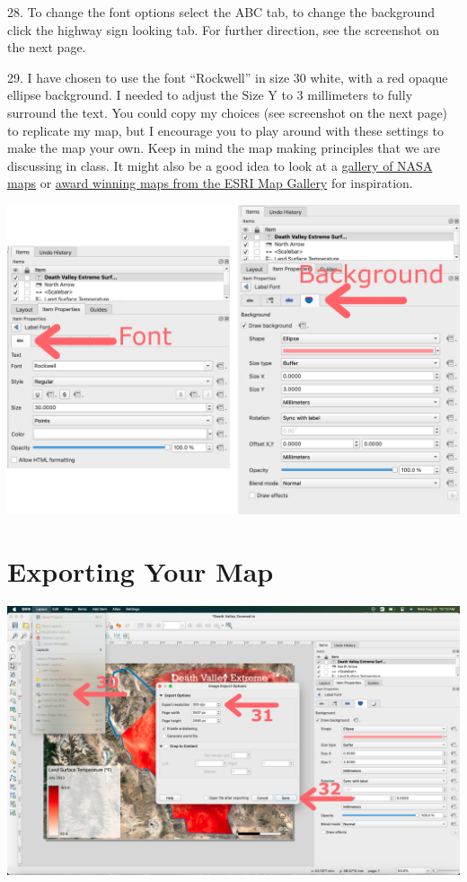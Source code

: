 \documentclass[oneside,a4paper,11pt,explicit]{book}
\begin{document}
28. To change the font options select the ABC tab, to change the background click the highway sign looking tab. For further direction, see the screenshot on the next page.

29.  I have chosen to use the font ``Rockwell'' in size 30 white, with a red opaque ellipse background. I needed to adjust the Size Y to 3 millimeters to fully surround the text. You could copy my choices (see screenshot on the next page) to replicate my map, but I encourage you to play around with these settings to make the map your own. Keep in mind the map making principles that we are discussing in class. It might also be a good idea to look at a \href{https://science.nasa.gov/earth/multimedia/}{gallery of NASA maps} or \href{https://mapgallery.esri.com/}{award winning maps from the ESRI Map Gallery} for inspiration. 

\centerline{\includegraphics[width=.75\textwidth]{AdjustTitle.png}}

\section{Exporting Your Map}

\centerline{\includegraphics[width=\textwidth]{MapExport.png}}
\end{document}

